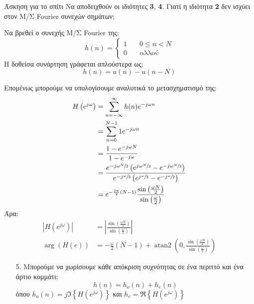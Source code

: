 \documentclass[11pt,a4paper,notitlepage,fleqn,draft]{article}
\begin{document}
\begin{questionbox}{Άσκηση για το σπίτι}
	Να αποδειχθούν οι ιδιότητες \textbf{3}, \textbf{4}. Γιατί η ιδιότητα \textbf{2} δεν ισχύει στον Μ/Σ Fourier συνεχών σημάτων;
\end{questionbox}

\begin{exercise}
	Να βρεθεί ο συνεχής Μ/Σ Fourier της:
	\[
	h(n) = \begin{cases}
	1 & \quad 0 \leq n < N\\
	0 & \quad \text{αλλού}
	\end{cases}
	\]
	\tcblower
	Η δοθείσα συνάρτηση γράφεται απλούστερα ως:
	\[
	h(n) = u(n) - u(n-N)
	\]
	
	Επομένως μπορούμε να υπολογίσουμε αναλυτικά το μετασχηματισμό της:
	\begin{align*}
		H\left(e^{j\omega }\right)
		&= \sum_{n=-\infty}^{\infty} h(n) e^{-j\omega n}
		\\ &= \sum_{n=0}^{N-1} 1 e^{-j\omega n}
		\\ &= \frac{1-e^{-j\omega N}}{1-e^{-j\omega }}
		\\ &= \frac
		{
			e^{-j\omega \sfrac{N}{2} } 
			\left(
				e^{j\omega \sfrac{N}{2} }-e^{-j\omega \sfrac{N}{2} }
			\right)
		}
		{ 
			e^{-j\sfrac{\omega }{2} }  
			\left( e^{j\sfrac{\omega }{2}  }
			-e^{-j\sfrac{\omega }{2} 	}\right)
		}
	\\ &= e^{-\frac{j\omega }{2} (N-1)}	\frac{\sin\left(\frac{\omega N}{2}\right)}{\sin\left(\frac{\omega}{2}\right)}
	\end{align*}
	Άρα:
	\begin{align*}
		\left|H\left(e^{j\omega }\right)\right|
		 &= \left|
		\frac{\sin\left(\frac{\omega N}{2}\right)}{\sin\left(\frac{\omega}{2}\right)}
		\right|
		\\
		\arg\left(H\left(e\right)\right) &= -\frac{\omega}{2}(N-1) + \mathop{atan2}\left(0, \frac{\sin\left(\frac{\omega N}{2}\right)}{\sin\left(\frac{\omega}{2}\right)}\right)
	\end{align*}
\end{exercise}

\begin{enumerate}
	\item[5.]
	Μπορούμε να χωρίσουμε κάθε απόκριση συχνότητας σε ένα περιττό και ένα άρτιο κομμάτι:
	\[
	h(n) = h_o(n) + h_e(n)
	\]
	όπου \( h_o(n) = j\Im \left\lbrace H\left(e^{j\omega }\right)\right\rbrace \)
	και \( h_e = \Re\left\lbrace H\left(e^{j\omega }\right) \right\rbrace \)
\end{enumerate}
\end{document}
